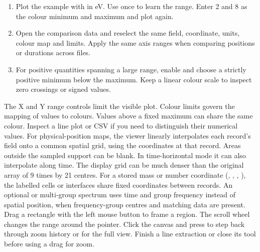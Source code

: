 \begin{enumerate}
\item Plot the example with  in eV. Use  once to learn the range. Enter 2 and 8 as the colour minimum and maximum and plot again.
\item Open the comparison data and reselect the same field, coordinate, units, colour map and limits. Apply the same axis ranges when comparing positions or durations across files.
\item For positive quantities spanning a large range, enable  and choose a strictly positive minimum below the maximum. Keep a linear colour scale to inspect zero crossings or signed values.
\end{enumerate}
The X and Y range controls limit the visible plot. Colour limits govern the mapping of values to colours. Values above a fixed maximum can share the same colour. Inspect a line plot or CSV if you need to distinguish their numerical values.
For physical-position maps, the viewer linearly interpolates each record's field onto a common spatial grid, using the coordinates at that record. Areas outside the sampled support can be blank. In time-horizontal mode it can also interpolate along time. The display grid can be much denser than the original array of 9 times by 21 centres.
For a stored mass or number coordinate (, , , ), the labelled cells or interfaces share fixed coordinates between records. An optional  or  multi-group spectrum uses time and group frequency instead of spatial position, when frequency-group centres and matching data are present.
Drag a rectangle with the left mouse button to frame a region. The scroll wheel changes the range around the pointer. Click the canvas and press  to step back through zoom history or  for the full view. Finish a line extraction or close its tool before using a drag for zoom.
